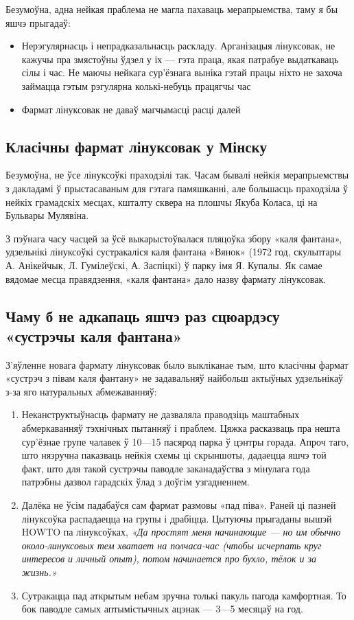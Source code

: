 \documentclass[10pt, a5paper]{article}
\begin{document}
Безумоўна, адна нейкая праблема не магла пахаваць мерапрыемства, таму я бы яшчэ прыгадаў:
\begin{itemize}
  \item Нерэгулярнасць і непрадказальнасць раскладу. Арганізацыя лінуксовак, не кажучы пра змястоўны ўдзел у іх — гэта праца, якая патрабуе выдаткаваць сілы і час. Не маючы нейкага сур'ёзнага выніка гэтай працы ніхто не захоча займацца гэтым рэгулярна колькі-небуць працягчы час
  \item Фармат лінуксовак не даваў магчымасці расці далей
\end{itemize}

\subsection*{Класічны фармат лінуксовак у Мінску}

Безумоўна, не ўсе лінуксоўкі праходзілі так. Часам бывалі нейкія мерапрыемствы з дакладамі ў прыстасаваным для гэтага памяшканні, але большасць праходзіла ў нейкіх грамадскіх месцах, кшталту сквера на плошчы Якуба Коласа, ці на Бульвары Мулявіна.

З пэўнага часу часцей за ўсё выкарыстоўвалася пляцоўка збору «каля фантана», удзельнікі лінуксоўкі сустракаліся каля фантана «Вянок» (1972 год, скульптары А. Анікейчык, Л. Гумілеўскі, А. Заспіцкі) ў парку імя Я. Купалы. Як самае вядомае месца правядзення, «каля фантана» дало назву фармату лінуксовак.

\subsection*{Чаму б не адкапаць яшчэ раз сцюардэсу «сустрэчы каля фантана»}

З'яўленне новага фармату лінуксовак было выкліканае тым, што класічны фармат «сустрэч з півам каля фантану» не задавальняў найбольш актыўных удзельнікаў з-за яго натуральных абмежаванняў:
\begin{enumerate}
  \item Неканструктыўнасць фармату не дазваляла праводзіць маштабных абмеркаванняў тэхнічных пытанняў і праблем. Цяжка расказваць пра нешта сур'ёзнае групе чалавек ў 10—15 пасярод парка ў цэнтры горада. Апроч таго, што нязручна паказваць нейкія схемы ці скрыншоты, дадаецца яшчэ той факт, што для такой сустрэчы паводле заканадаўства з мінулага года патрэбны дазвол гарадскіх ўлад з доўгім узгадненнем.
  \item Далёка не ўсім падабаўся сам фармат размовы «пад піва». Раней ці пазней лінуксоўка распадаецца на групы і драбіцца. Цытуючы прыгаданы вышэй HOWTO па лінуксоўках, \textit{«Да простят меня начинающие — но им обычно около-линуксовых тем хватает на полчаса-час (чтобы исчерпать круг интересов и личный опыт), потом начинается про бухло, тёлок и за жизнь.»}
  \item Сутракацца пад аткрытым небам зручна толькі пакуль пагода камфортная. То бок паводле самых аптымістычных ацэнак — 3—5 месяцаў на год.
\end{enumerate}
\end{document}
